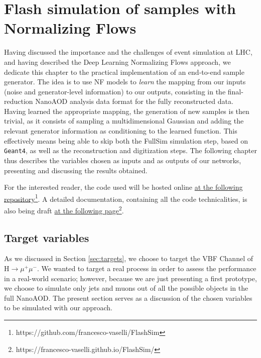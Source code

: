 \chapter{Flash simulation of samples with Normalizing Flows}\label{ch:fs} %

Having discussed the importance and the challenges of event simulation at LHC, and having described the Deep Learning Normalizing Flows approach, we dedicate this chapter to the practical implementation of an end-to-end sample generator.
The idea is to use NF models to \emph{learn} the mapping from our inputs (noise and generator-level information) to our outputs, consisting in the final-reduction NanoAOD analysis data format for the fully reconstructed data. Having learned the appropriate mapping, the generation of new samples is then trivial, as it consists of sampling a multidimensional Gaussian and adding the relevant generator information as conditioning to the learned function. This effectively means being able to skip both the FullSim simulation step, based on \texttt{Geant4}, as well as the reconstruction and digitization steps. The following chapter thus describes the variables chosen as inputs and as outputs of our networks, presenting and discussing the results obtained.

For the interested reader, the code used will be hosted online \href{https://github.com/francesco-vaselli/FlashSim}{at the following repository}\footnote{https://github.com/francesco-vaselli/FlashSim}. A detailed documentation, containing all the code technicalities, is also being draft \href{https://francesco-vaselli.github.io/FlashSim/}{at the following page}\footnote{https://francesco-vaselli.github.io/FlashSim/}.

\section{Target variables}

As we discussed in Section \ref{sec:targets}, we choose to target the VBF Channel of H$\rightarrow\mu^+\mu^-$. We wanted to target a real process in order to assess the performance in a real-world scenario; however, because we are just presenting a first prototype, we choose to simulate only jets and muons out of all the possible objects in the full NanoAOD. The present section serves as a discussion of the chosen variables to be simulated with our approach.

